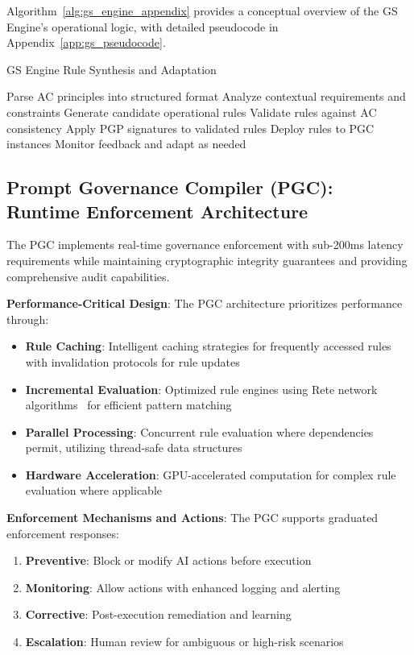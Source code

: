 \documentclass[sigconf,review,anonymous=false]{acmart} %
\begin{document}
Algorithm~\ref{alg:gs_engine_appendix} provides a conceptual overview of the GS Engine's operational logic, with detailed pseudocode in Appendix~\ref{app:gs_pseudocode}.

\begin{algorithm}[h]
\caption{GS Engine Rule Synthesis and Adaptation}
\label{alg:gs_engine_appendix}
Parse AC principles into structured format\;
Analyze contextual requirements and constraints\;
Generate candidate operational rules\;
Validate rules against AC consistency\;
Apply PGP signatures to validated rules\;
Deploy rules to PGC instances\;
Monitor feedback and adapt as needed\;
\end{algorithm}

\subsection{Prompt Governance Compiler (PGC): Runtime Enforcement Architecture}
\label{subsec:pgc_detailed}
The PGC implements real-time governance enforcement with sub-200ms latency requirements while maintaining cryptographic integrity guarantees and providing comprehensive audit capabilities.

\textbf{Performance-Critical Design}: The PGC architecture prioritizes performance through:
\begin{itemize}
    \item \textbf{Rule Caching}: Intelligent caching strategies for frequently accessed rules with invalidation protocols for rule updates
    \item \textbf{Incremental Evaluation}: Optimized rule engines using Rete network algorithms~\cite{ForgyReteMatchingAlgorithm82} for efficient pattern matching
    \item \textbf{Parallel Processing}: Concurrent rule evaluation where dependencies permit, utilizing thread-safe data structures
    \item \textbf{Hardware Acceleration}: GPU-accelerated computation for complex rule evaluation where applicable
\end{itemize}

\textbf{Enforcement Mechanisms and Actions}: The PGC supports graduated enforcement responses:
\begin{enumerate}
    \item \textbf{Preventive}: Block or modify AI actions before execution
    \item \textbf{Monitoring}: Allow actions with enhanced logging and alerting
    \item \textbf{Corrective}: Post-execution remediation and learning
    \item \textbf{Escalation}: Human review for ambiguous or high-risk scenarios
\end{enumerate}
\end{document}
